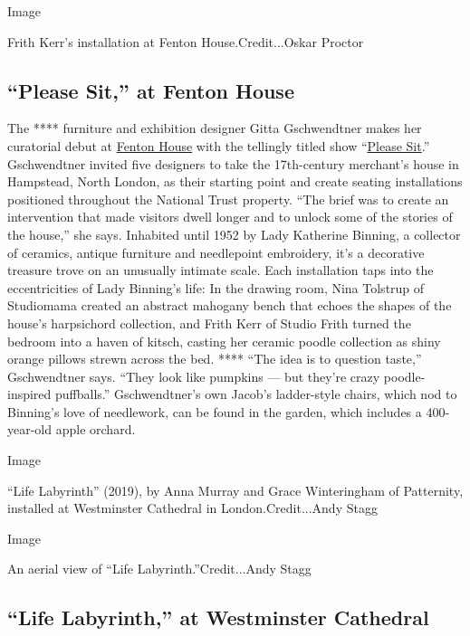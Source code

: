 Image

Frith Kerr's installation at Fenton House.Credit...Oskar Proctor

\hypertarget{please-sit-at-fenton-house}{%
\subsection{``Please Sit,'' at Fenton
House}\label{please-sit-at-fenton-house}}

The **** furniture and exhibition designer Gitta Gschwendtner makes her
curatorial debut at
\href{https://www.nationaltrust.org.uk/fenton-house-and-garden}{Fenton
House} with the tellingly titled show
``\href{https://www.londondesignfestival.com/event/please-sit}{Please
Sit}.'' Gschwendtner invited five designers to take the 17th-century
merchant's house in Hampstead, North London, as their starting point and
create seating installations positioned throughout the National Trust
property. ``The brief was to create an intervention that made visitors
dwell longer and to unlock some of the stories of the house,'' she says.
Inhabited until 1952 by Lady Katherine Binning, a collector of ceramics,
antique furniture and needlepoint embroidery, it's a decorative treasure
trove on an unusually intimate scale. Each installation taps into the
eccentricities of Lady Binning's life: In the drawing room, Nina
Tolstrup of Studiomama created an abstract mahogany bench that echoes
the shapes of the house's harpsichord collection, and Frith Kerr of
Studio Frith turned the bedroom into a haven of kitsch, casting her
ceramic poodle collection as shiny orange pillows strewn across the bed.
**** ``The idea is to question taste,'' Gschwendtner says. ``They look
like pumpkins --- but they're crazy poodle-inspired puffballs.''
Gschwendtner's own Jacob's ladder-style chairs, which nod to Binning's
love of needlework, can be found in the garden, which includes a
400-year-old apple orchard.

Image

``Life Labyrinth'' (2019), by Anna Murray and Grace Winteringham of
Patternity, installed at Westminster Cathedral in London.Credit...Andy
Stagg

Image

An aerial view of ``Life Labyrinth.''Credit...Andy Stagg

\hypertarget{life-labyrinth-at-westminster-cathedral}{%
\subsection{``Life Labyrinth,'' at Westminster
Cathedral}\label{life-labyrinth-at-westminster-cathedral}}

